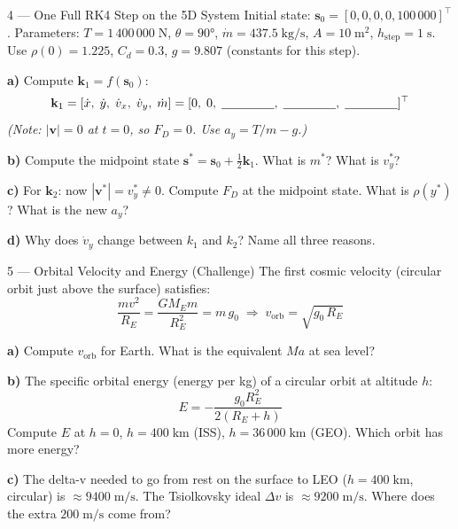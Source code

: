 \documentclass[12pt, a4paper]{article}
\begin{document}
\begin{exercisebox}{4 — One Full RK4 Step on the 5D System}
Initial state: $\mathbf{s}_0 = [0, 0, 0, 0, 100\,000]^\top$.
Parameters: $T = 1\,400\,000\;\text{N}$, $\theta = 90°$, $\dot{m} = 437.5\;\text{kg/s}$, $A=10\;\text{m}^2$, $h_\text{step}=1\;\text{s}$.
Use $\rho(0) = 1.225$, $C_d = 0.3$, $g = 9.807$ (constants for this step).

\textbf{a)} Compute $\mathbf{k}_1 = f(\mathbf{s}_0)$:
\[
  \mathbf{k}_1 = [\dot{x},\; \dot{y},\; \dot{v}_x,\; \dot{v}_y,\; \dot{m}]
  = [0,\; 0,\; \underline{\hspace{1.5cm}},\; \underline{\hspace{1.5cm}},\; \underline{\hspace{1.5cm}}]^\top
\]
\textit{(Note: $|\mathbf{v}|=0$ at $t=0$, so $F_D=0$. Use $a_y = T/m - g$.)}

\textbf{b)} Compute the midpoint state $\mathbf{s}^* = \mathbf{s}_0 + \frac{1}{2}\mathbf{k}_1$. What is $m^*$? What is $v_y^*$?

\textbf{c)} For $\mathbf{k}_2$: now $|\mathbf{v}^*| = v_y^* \neq 0$. Compute $F_D$ at the midpoint state.
What is $\rho(y^*)$? What is the new $a_y$?

\textbf{d)} Why does $\dot{v}_y$ change between $k_1$ and $k_2$? Name all three reasons.
\end{exercisebox}

\begin{solutionspace}[11cm]
\end{solutionspace}

\begin{exercisebox}{5 — Orbital Velocity and Energy (Challenge)}
The first cosmic velocity (circular orbit just above the surface) satisfies:
\[
  \frac{mv^2}{R_E} = \frac{G M_E m}{R_E^2} = m\,g_0 \;\Rightarrow\; v_\text{orb} = \sqrt{g_0\,R_E}
\]

\textbf{a)} Compute $v_\text{orb}$ for Earth. What is the equivalent $Ma$ at sea level?

\textbf{b)} The specific orbital energy (energy per kg) of a circular orbit at altitude $h$:
\[
  E = -\frac{g_0 R_E^2}{2(R_E + h)}
\]
Compute $E$ at $h=0$, $h=400\;\text{km}$ (ISS), $h=36\,000\;\text{km}$ (GEO). Which orbit has more energy?

\textbf{c)} The delta-v needed to go from rest on the surface to LEO ($h=400\;\text{km}$, circular) is $\approx 9400\;\text{m/s}$.
The Tsiolkovsky ideal $\Delta v$ is $\approx 9200\;\text{m/s}$. Where does the extra $200\;\text{m/s}$ come from?
\end{exercisebox}
\end{document}
